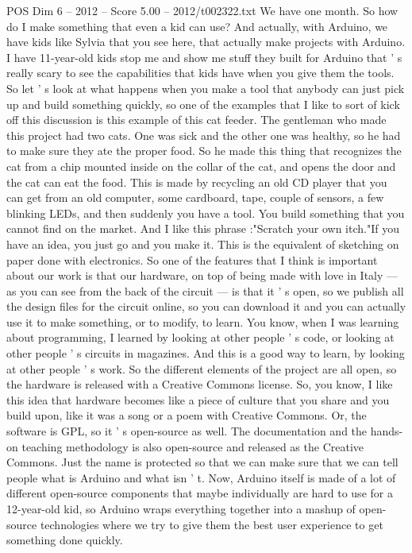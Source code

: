\begin{textsample}{POS Dim 6 – 2012 – Score 5.00 – 2012/t002322.txt}
We have one month.
So how do I make something that even a kid can use?
And actually, with Arduino, we have kids like Sylvia that you see here, that actually make projects with Arduino.
I have 11-year-old kids stop me and show me stuff they built for Arduino that ' s really scary to see the capabilities that kids have when you give them the tools.
So let ' s look at what happens when you make a tool that anybody can just pick up and build something quickly, so one of the examples that I like to sort of kick off this discussion is this example of this cat feeder.
The gentleman who made this project had two cats.
One was sick and the other one was healthy, so he had to make sure they ate the proper food.
So he made this thing that recognizes the cat from a chip mounted inside on the collar of the cat, and opens the door and the cat can eat the food.
This is made by recycling an old CD player that you can get from an old computer, some cardboard, tape, couple of sensors, a few blinking LEDs, and then suddenly you have a tool.
You build something that you cannot find on the market.
And I like this phrase :"Scratch your own itch."If you have an idea, you just go and you make it.
This is the equivalent of sketching on paper done with electronics.
So one of the features that I think is important about our work is that our hardware, on top of being made with love in Italy — as you can see from the back of the circuit — is that it ' s open, so we publish all the design files for the circuit online, so you can download it and you can actually use it to make something, or to modify, to learn.
You know, when I was learning about programming, I learned by looking at other people ' s code, or looking at other people ' s circuits in magazines.
And this is a good way to learn, by looking at other people ' s work.
So the different elements of the project are all open, so the hardware is released with a Creative Commons license.
So, you know, I like this idea that hardware becomes like a piece of culture that you share and you build upon, like it was a song or a poem with Creative Commons.
Or, the software is GPL, so it ' s open-source as well.
The documentation and the hands-on teaching methodology is also open-source and released as the Creative Commons.
Just the name is protected so that we can make sure that we can tell people what is Arduino and what isn ' t.
Now, Arduino itself is made of a lot of different open-source components that maybe individually are hard to use for a 12-year-old kid, so Arduino wraps everything together into a mashup of open-source technologies where we try to give them the best user experience to get something done quickly.

\end{textsample}
